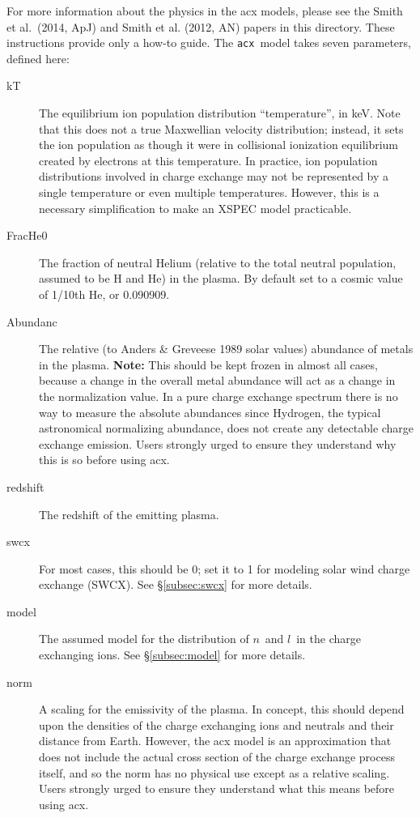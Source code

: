 \documentclass[11pt]{article}
\begin{document}
For more information about the physics in the acx models, please see
the Smith et al.\ (2014, ApJ) and Smith et al. (2012, AN) papers in
this directory.  These 
instructions provide only a how-to guide.  The {\tt acx}\ model takes
seven parameters, defined here:
\begin{description}
\item[kT] The equilibrium ion population distribution ``temperature'',
  in keV.  Note that this does not a true Maxwellian velocity
  distribution; instead, it sets the ion population as though it were
  in collisional ionization equilibrium created by electrons at this
  temperature.  In practice, ion population distributions involved in
  charge exchange may not be represented by a single temperature or
  even multiple temperatures.  However, this is a necessary
  simplification to make an XSPEC model practicable.  
\item[FracHe0] The fraction of neutral Helium (relative to the total
  neutral population, assumed to be H and He) in the plasma.  By
  default set to a cosmic value of 1/10th He, or 0.090909.
\item[Abundanc] The relative (to Anders \& Greveese 1989 solar values)
  abundance of metals in the plasma.  {\bf Note:} This should be kept
  frozen in almost all cases, because a change in the overall metal
  abundance will act as a change in the normalization value.  In a
  pure charge exchange spectrum there is no way to measure the
  absolute abundances since Hydrogen, the typical astronomical
  normalizing abundance, does not create any detectable charge
  exchange emission.  Users strongly urged to ensure they understand
  why this is so before using acx.
\item[redshift] The redshift of the emitting plasma.  
\item[swcx] For most cases, this should be 0; set it to 1 for modeling
  solar wind charge exchange (SWCX).  See \S\ref{subsec:swcx} for more details.
\item[model] The assumed model for the distribution of $n$\ and $l$\
  in the charge exchanging ions.  See \S\ref{subsec:model} for more details.
\item[norm] A scaling for the emissivity of the plasma.  In concept,
  this should depend upon the densities of the charge exchanging ions
  and neutrals and their distance from Earth.  However, the acx model
  is an approximation that does not include the actual cross section
  of the charge exchange process itself, and so the norm has no
  physical use except as a relative scaling.  Users strongly urged to
  ensure they understand what this means before using acx.
\end{description}
\end{document}
